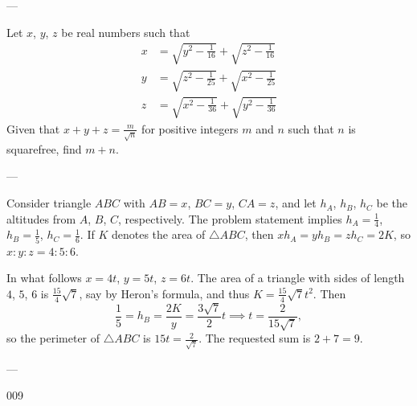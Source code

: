 
---

Let $x$, $y$, $z$ be real numbers such that 
\begin{align*}
    x&=\sqrt{y^2-\tfrac1{16}}+\sqrt{z^2-\tfrac1{16}}\\
    y&=\sqrt{z^2-\tfrac1{25}}+\sqrt{x^2-\tfrac1{25}}\\
    z&=\sqrt{x^2-\tfrac1{36}}+\sqrt{y^2-\tfrac1{36}}
\end{align*}
Given that $x+y+z=\tfrac m{\sqrt n}$ for positive integers $m$ and $n$ such that $n$ is squarefree, find $m+n$.

---

Consider triangle $ABC$ with $AB=x$, $BC=y$, $CA=z$, and let $h_A$, $h_B$, $h_C$ be the altitudes from $A$, $B$, $C$, respectively. The problem statement implies $h_A=\tfrac14$, $h_B=\tfrac15$, $h_C=\tfrac16$. If $K$ denotes the area of $\triangle ABC$, then $xh_A=yh_B=zh_C=2K$, so $x:y:z=4:5:6$.

In what follows $x=4t$, $y=5t$, $z=6t$. The area of a triangle with sides of length $4$, $5$, $6$ is $\tfrac{15}4\sqrt7$, say by Heron's formula, and thus $K=\tfrac{15}4\sqrt7t^2$. Then \[\frac15=h_B=\frac{2K}y=\frac{3\sqrt7}2t\implies t=\frac2{15\sqrt7},\]
so the perimeter of $\triangle ABC$ is $15t=\tfrac2{\sqrt7}$. The requested sum is $2+7=9$.

---

009
